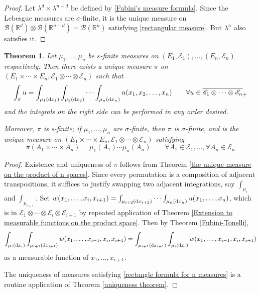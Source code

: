 \documentclass[11pt, a4paper, openany]{book}
\newtheorem{thm}{Theorem}\newtheorem{lem}{Lemma}\newtheorem{crl}{Corollary}
\theoremstyle{definition}
\begin{document}
    \begin{proof}
        Let $\lambda^d\times \lambda^{n-d}$ be defined by \eqref{Fubini's measure formula}. Since the Lebesgue measures are $\sigma$-finite, it is the unique measure on $\mathscr{B}(\mathbb{R}^d)\otimes \mathscr{B}(\mathbb{R}^{n-d})=\mathscr{B}(\mathbb{R}^n)$ satisfying \eqref{rectangular measure}. But $\lambda^n$ also satisfies it.
    \end{proof}
    \begin{thm}\label{Fubini-Tonelli generalized to n measures}
        Let $\mu_1,\dots,\mu_n$ be $s$-finite measures on $(E_1,\mathscr{E}_1),\dots,(E_n,\mathscr{E}_n)$ respectively. Then there exists a unique measure $\pi$ on $(E_1\times \cdots\times E_n,\mathscr{E}_1\otimes\cdots\otimes\mathscr{E}_n)$ such that
        \[
            \int_\pi u=\int_{\mu_1(\odif{x_1})}\int_{\mu_2(\odif{x_2})}\cdots \int_{\mu_n(\odif{x_n})} u(x_1,x_2,\dots,x_n)\qquad \forall u\in\overline{\mathscr{E}_1\otimes\cdots\otimes\mathscr{E}_n}_+
        \]
        and the integrals on the right side can be performed in any order desired.

        Moreover, $\pi$ is s-finite; if $\mu_1,\dots,\mu_n$ are $\sigma$-finite, then $\pi$ is $\sigma$-finite, and is the unique measure on $(E_1\times \cdots\times E_n,\mathscr{E}_1\otimes\cdots\otimes\mathscr{E}_n)$ satisfying
        \begin{equation}\label{rectangle formula for n measures}
            \pi(A_1\times\cdots\times A_n)=\mu_1(A_1)\cdots\mu_n(A_n)\qquad\forall A_1\in\mathscr{E}_1,\dots,\forall A_n\in\mathscr{E}_n
        \end{equation}
    \end{thm}
    \begin{proof}
        Existence and uniqueness of $\pi$ follows from Theorem \ref{the unique measure on the product of n spaces}. 
        Since every permutation is a composition of adjacent transpositions, it suffices to justify swapping two adjacent integrations, say $\int_{\mu_i}$ and $\int_{\mu_{i+1}}$. Set $w(x_1,\dots,x_i,x_{i+1})=\int_{\mu_{i+2}(\odif x_{i+2})}\cdots\int_{\mu_n(\odif x_n)}u(x_1,\dots,x_n)$, which is in $\mathscr{E}_1\otimes\cdots\otimes\mathscr{E}_i\otimes\mathscr{E}_{i+1}$ by repeated application of Theorem \ref{Extension to measurable functions on the product space}. Then by Theorem \ref{Fubini-Tonelli}, 
        \[
            \int_{\mu_i(\odif x_i)}\int_{\mu_{i+1}(\odif x_{i+1})}w(x_1,\dots,x_{i-1},x_{i},x_{i+1})=\int_{\mu_{i+1}(\odif x_{i+1})}\int_{\mu_i(\odif x_i)}w(x_1,\dots,x_{i-1},x_{i},x_{i+1})
        \]
        as a measurable function of $x_1,\dots,x_{i+1}$. 
        
        The uniqueness of measures satisfying \eqref{rectangle formula for n measures} is a routine application of Theorem \ref{uniqueness theorem}.
    \end{proof}
\end{document}
